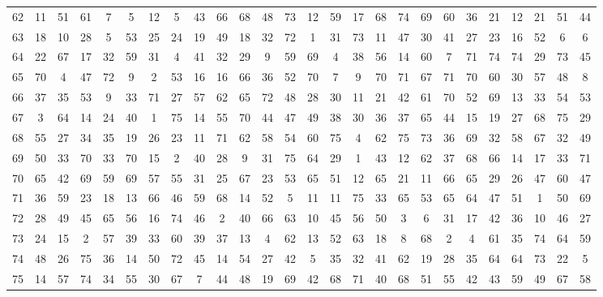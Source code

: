 \begin{table}
\begin{tabular}{c c c c c c c c c c c c c c c c c c c c c c c c c c }
62 & 11 & 51 & 61 & 7 & 5 & 12 & 5 & 43 & 66 & 68 & 48 & 73 & 12 & 59 & 17 & 68 & 74 & 69 & 60 & 36 & 21 & 12 & 21 & 51 & 44 \\
63 & 18 & 10 & 28 & 5 & 53 & 25 & 24 & 19 & 49 & 18 & 32 & 72 & 1 & 31 & 73 & 11 & 47 & 30 & 41 & 27 & 23 & 16 & 52 & 6 & 6 \\
64 & 22 & 67 & 17 & 32 & 59 & 31 & 4 & 41 & 32 & 29 & 9 & 59 & 69 & 4 & 38 & 56 & 14 & 60 & 7 & 71 & 74 & 74 & 29 & 73 & 45 \\
65 & 70 & 4 & 47 & 72 & 9 & 2 & 53 & 16 & 16 & 66 & 36 & 52 & 70 & 7 & 9 & 70 & 71 & 67 & 71 & 70 & 60 & 30 & 57 & 48 & 8 \\
66 & 37 & 35 & 53 & 9 & 33 & 71 & 27 & 57 & 62 & 65 & 72 & 48 & 28 & 30 & 11 & 21 & 42 & 61 & 70 & 52 & 69 & 13 & 33 & 54 & 53 \\
67 & 3 & 64 & 14 & 24 & 40 & 1 & 75 & 14 & 55 & 70 & 44 & 47 & 49 & 38 & 30 & 36 & 37 & 65 & 44 & 15 & 19 & 27 & 68 & 75 & 29 \\
68 & 55 & 27 & 34 & 35 & 19 & 26 & 23 & 11 & 71 & 62 & 58 & 54 & 60 & 75 & 4 & 62 & 75 & 73 & 36 & 69 & 32 & 58 & 67 & 32 & 49 \\
69 & 50 & 33 & 70 & 33 & 70 & 15 & 2 & 40 & 28 & 9 & 31 & 75 & 64 & 29 & 1 & 43 & 12 & 62 & 37 & 68 & 66 & 14 & 17 & 33 & 71 \\
70 & 65 & 42 & 69 & 59 & 69 & 57 & 55 & 31 & 25 & 67 & 23 & 53 & 65 & 51 & 12 & 65 & 21 & 11 & 66 & 65 & 29 & 26 & 47 & 60 & 47 \\
71 & 36 & 59 & 23 & 18 & 13 & 66 & 46 & 59 & 68 & 14 & 52 & 5 & 11 & 11 & 75 & 33 & 65 & 53 & 65 & 64 & 47 & 51 & 1 & 50 & 69 \\
72 & 28 & 49 & 45 & 65 & 56 & 16 & 74 & 46 & 2 & 40 & 66 & 63 & 10 & 45 & 56 & 50 & 3 & 6 & 31 & 17 & 42 & 36 & 10 & 46 & 27 \\
73 & 24 & 15 & 2 & 57 & 39 & 33 & 60 & 39 & 37 & 13 & 4 & 62 & 13 & 52 & 63 & 18 & 8 & 68 & 2 & 4 & 61 & 35 & 74 & 64 & 59 \\
74 & 48 & 26 & 75 & 36 & 14 & 50 & 72 & 45 & 14 & 54 & 27 & 42 & 5 & 35 & 32 & 41 & 62 & 19 & 28 & 35 & 64 & 64 & 73 & 22 & 5 \\
75 & 14 & 57 & 74 & 34 & 55 & 30 & 67 & 7 & 44 & 48 & 19 & 69 & 42 & 68 & 71 & 40 & 68 & 51 & 55 & 42 & 43 & 59 & 49 & 67 & 58 \\
\hline
\end{tabular}
\end{table}